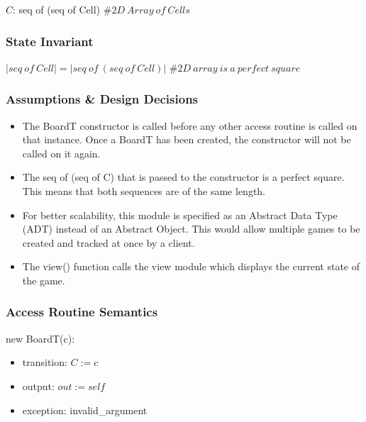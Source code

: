 \documentclass[12pt]{article}
\begin{document}
$C$: seq of (seq of Cell) $\mathit{\# 2D \ Array \ of \ Cells}$

\subsubsection* {State Invariant}

$|seq \ of \ Cell| = |seq \ of \ (seq \ of \ Cell)|$ $\mathit{\# 2D \ array 
\ is \ a \ perfect \ square}$

\subsubsection* {Assumptions \& Design Decisions}

\begin{itemize}

\item The BoardT constructor is called before any other access
  routine is called on that instance. Once a BoardT has been created, the
  constructor will not be called on it again.
  
\item The seq of (seq of C) that is passed to the constructor is a perfect square. This means
that both sequences are of the same length.

\item For better scalability, this module is specified as an Abstract Data Type
  (ADT) instead of an Abstract Object. This would allow multiple games to be
  created and tracked at once by a client.
  
\item The view() function calls the view module which displays the current state of the game.

\end{itemize}

\subsubsection* {Access Routine Semantics}

new BoardT(c):
\begin{itemize}
    \item transition: $C := c$
    \item output: $out := self$
    \item exception: invalid\_argument
\end{itemize}
\end{document}
